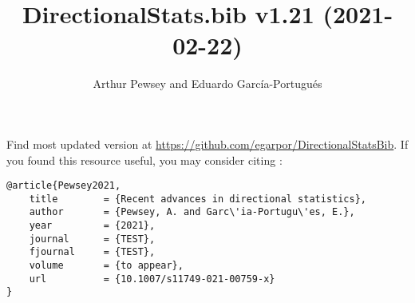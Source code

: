 \documentclass[10pt]{article}
\title{DirectionalStats.bib v1.21 (2021-02-22)}
\author{Arthur Pewsey and Eduardo García-Portugués}
\date{}
\begin{document}
\maketitle

Find most updated version at \url{https://github.com/egarpor/DirectionalStatsBib}. If you found this resource useful, you may consider citing \cite{Pewsey2021}:
\begin{verbatim}
@article{Pewsey2021,
    title        = {Recent advances in directional statistics},
    author       = {Pewsey, A. and Garc\'ia-Portugu\'es, E.},
    year         = {2021},
    journal      = {TEST},
    fjournal     = {TEST},
    volume       = {to appear},
    url          = {10.1007/s11749-021-00759-x}
}
\end{verbatim}

\nocite{*}

\setlength\bibsep{0cm}
\setlength\bibhang{0.25cm}



\end{document}
